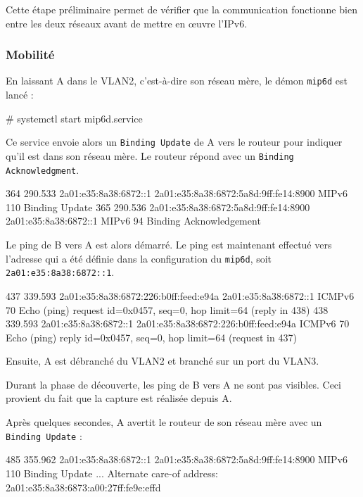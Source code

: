 Cette étape préliminaire permet de vérifier que la communication fonctionne bien entre les deux réseaux avant de mettre en œuvre l'IPv6.

\subsubsection{Mobilité}

En laissant A dans le VLAN2, c'est-à-dire son réseau mère, le démon \texttt{mip6d} est lancé :

\begin{code}
# systemctl start mip6d.service
\end{code}

Ce service envoie alors un \texttt{Binding Update} de A vers le routeur pour indiquer qu'il est dans son réseau mère.
Le routeur répond avec un \texttt{Binding Acknowledgment}.

\begin{paquet}
364	290.533	2a01:e35:8a38:6872::1	2a01:e35:8a38:6872:5a8d:9ff:fe14:8900	MIPv6	110	Binding Update
365	290.536	2a01:e35:8a38:6872:5a8d:9ff:fe14:8900	2a01:e35:8a38:6872::1	MIPv6	94	Binding Acknowledgement
\end{paquet}

Le ping de B vers A est alors démarré.
Le ping est maintenant effectué vers l'adresse qui a été définie dans la configuration du \texttt{mip6d}, soit \texttt{	2a01:e35:8a38:6872::1}.

\begin{paquet}
437	339.593	2a01:e35:8a38:6872:226:b0ff:feed:e94a	2a01:e35:8a38:6872::1	ICMPv6	70	Echo (ping) request id=0x0457, seq=0, hop limit=64 (reply in 438)
438	339.593	2a01:e35:8a38:6872::1	2a01:e35:8a38:6872:226:b0ff:feed:e94a	ICMPv6	70	Echo (ping) reply id=0x0457, seq=0, hop limit=64 (request in 437)
\end{paquet}

Ensuite, A est débranché du VLAN2 et branché sur un port du VLAN3.

\begin{warning}
Durant la phase de découverte, les ping de B vers A ne sont pas visibles.
Ceci provient du fait que la capture est réalisée depuis A.
\end{warning}

Après quelques secondes, A avertit le routeur de son réseau mère avec un \texttt{Binding Update} :

\begin{paquet}
485	355.962	2a01:e35:8a38:6872::1	2a01:e35:8a38:6872:5a8d:9ff:fe14:8900	MIPv6	110	Binding Update
...
    Alternate care-of address: 2a01:e35:8a38:6873:a00:27ff:fe9e:effd
\end{paquet}

